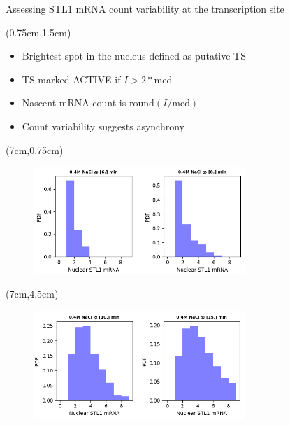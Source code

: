 \documentclass[aspectratio=1610]{beamer}					%
\begin{document}
\begin{frame}{Assessing STL1 mRNA count variability at the transcription site}

\begin{textblock*}{5cm}(0.75cm,1.5cm)
\begin{itemize}
\item Brightest spot in the nucleus defined as putative TS
\item TS marked ACTIVE if $I>2*\mathrm{med}$
\item Nascent mRNA count is $\mathrm{round}(I/\mathrm{med})$
\item Count variability suggests asynchrony
\end{itemize}

\end{textblock*}

\begin{textblock*}{5cm}(7cm,0.75cm)
\begin{figure}
\includegraphics[width=8cm]{active-ts-dist-2.png}
\end{figure}
\end{textblock*}

\begin{textblock*}{5cm}(7cm,4.5cm)
\begin{figure}
\includegraphics[width=8cm]{active-ts-dist-1.png}
\end{figure}
\end{textblock*}

\end{frame}
\end{document}
